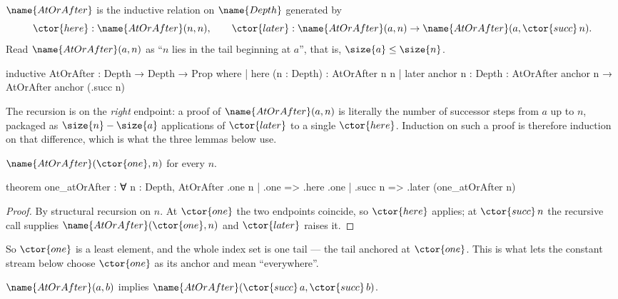 \begin{definition}\label{Completion:def:atorafter}
$\name{AtOrAfter}$ is the inductive relation on $\name{Depth}$ generated by
\[
  \ctor{here} : \name{AtOrAfter}(n, n),
  \qquad
  \ctor{later} : \name{AtOrAfter}(a, n) \to
    \name{AtOrAfter}(a, \ctor{succ}\,n).
\]
Read $\name{AtOrAfter}(a, n)$ as ``$n$ lies in the tail beginning at $a$'',
that is, $\size{a} \leq \size{n}$.
\end{definition}

\begin{leancode}
inductive AtOrAfter : Depth → Depth → Prop where
  | here (n : Depth) : AtOrAfter n n
  | later {anchor n : Depth} :
      AtOrAfter anchor n → AtOrAfter anchor (.succ n)
\end{leancode}

The recursion is on the \emph{right} endpoint: a proof of
$\name{AtOrAfter}(a,n)$ is literally the number of successor steps from $a$ up
to $n$, packaged as $\size{n} - \size{a}$ applications of $\ctor{later}$ to a
single $\ctor{here}$.  Induction on such a proof is therefore induction on
that difference, which is what the three lemmas below use.

\begin{lemma}\label{Completion:lem:one-atorafter}
$\name{AtOrAfter}(\ctor{one}, n)$ for every $n$.
\end{lemma}

\begin{leancode}
theorem one_atOrAfter : ∀ n : Depth, AtOrAfter .one n
  | .one => .here .one
  | .succ n => .later (one_atOrAfter n)
\end{leancode}

\begin{proof}
By structural recursion on $n$.  At $\ctor{one}$ the two endpoints coincide, so
$\ctor{here}$ applies; at $\ctor{succ}\,n$ the recursive call supplies
$\name{AtOrAfter}(\ctor{one}, n)$ and $\ctor{later}$ raises it.
\end{proof}

So $\ctor{one}$ is a least element, and the whole index set is one tail --- the
tail anchored at $\ctor{one}$.  This is what lets the constant stream below
choose $\ctor{one}$ as its anchor and mean ``everywhere''.

\begin{lemma}\label{Completion:lem:succ-atorafter}
$\name{AtOrAfter}(a,b)$ implies
$\name{AtOrAfter}(\ctor{succ}\,a, \ctor{succ}\,b)$.
\end{lemma}

